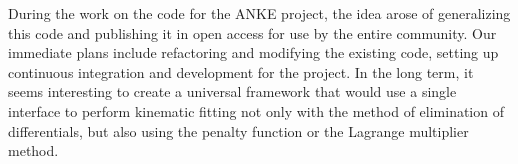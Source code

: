 
During the work on the code for the ANKE project, the idea arose of generalizing this code and publishing it in open access for use by the entire community.
Our immediate plans include refactoring and modifying the existing code, setting up continuous integration and development for the project.
In the long term, it seems interesting to create a universal framework that would use a single interface to perform kinematic fitting not only with the method of elimination of differentials, but also using the penalty function or the Lagrange multiplier method.

